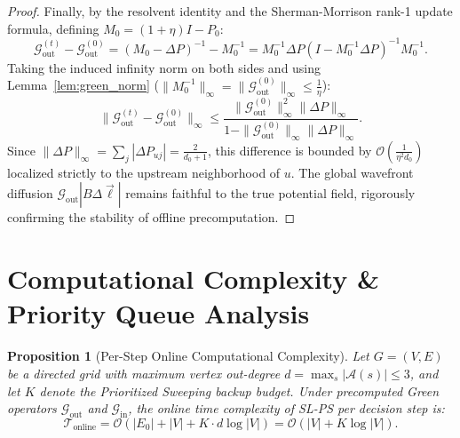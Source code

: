 \documentclass[11pt,a4paper]{article}
\newtheorem{proposition}{Proposition}
\begin{document}
\begin{proof}
Finally, by the resolvent identity and the Sherman-Morrison rank-1 update formula, defining $M_0 = (1 + \eta)I - P_0$:
\begin{equation}
\mathcal{G}_{\text{out}}^{(t)} - \mathcal{G}_{\text{out}}^{(0)} = \left( M_0 - \Delta P \right)^{-1} - M_0^{-1} = M_0^{-1} \Delta P \left( I - M_0^{-1} \Delta P \right)^{-1} M_0^{-1}.
\end{equation}
Taking the induced infinity norm on both sides and using Lemma~\ref{lem:green_norm} ($\|M_0^{-1}\|_\infty = \|\mathcal{G}_{\text{out}}^{(0)}\|_\infty \le \frac{1}{\eta}$):
\begin{equation}
\|\mathcal{G}_{\text{out}}^{(t)} - \mathcal{G}_{\text{out}}^{(0)}\|_\infty \le \frac{\|\mathcal{G}_{\text{out}}^{(0)}\|_\infty^2 \|\Delta P\|_\infty}{1 - \|\mathcal{G}_{\text{out}}^{(0)}\|_\infty \|\Delta P\|_\infty}.
\end{equation}
Since $\|\Delta P\|_\infty = \sum_j |\Delta P_{uj}| = \frac{2}{d_0 + 1}$, this difference is bounded by $\mathcal{O}\left( \frac{1}{\eta^2 d_0} \right)$ localized strictly to the upstream neighborhood of $u$. The global wavefront diffusion $\mathcal{G}_{\text{out}} |B \Delta \vec{\ell}|$ remains faithful to the true potential field, rigorously confirming the stability of offline precomputation.
\end{proof}

\section{Computational Complexity \& Priority Queue Analysis}
\label{sec:appendix_complexity}

\begin{proposition}[Per-Step Online Computational Complexity]
\label{prop:complexity}
Let $G = (V, E)$ be a directed grid with maximum vertex out-degree $d = \max_{s} |\mathcal{A}(s)| \le 3$, and let $K$ denote the Prioritized Sweeping backup budget. Under precomputed Green operators $\mathcal{G}_{\text{out}}$ and $\mathcal{G}_{\text{in}}$, the online time complexity of SL-PS per decision step is:
\begin{equation}
\mathcal{T}_{\text{online}} = \mathcal{O}\left( |E_0| + |V| + K \cdot d \log |V| \right) = \mathcal{O}(|V| + K \log |V|).
\end{equation}
\end{proposition}
\end{document}
